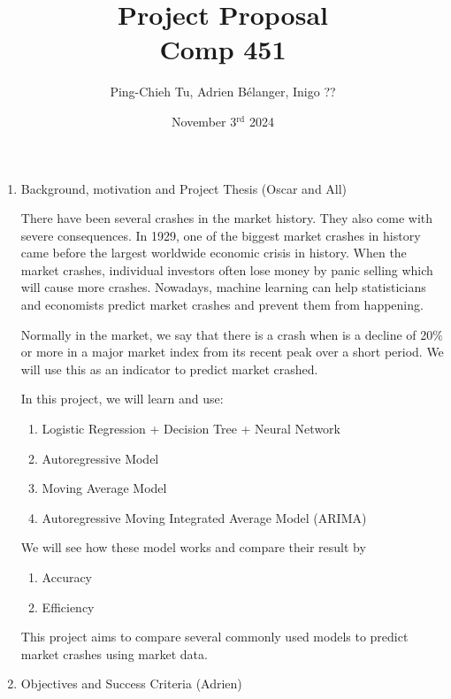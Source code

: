 \documentclass[10pt, letterpaper]{article}
\title{
  Project Proposal \\
  \Large Comp 451}
\author{Ping-Chieh Tu, Adrien Bélanger, Inigo ??}
\date{November 3$^{\text{rd}}$ 2024}
\begin{document}
\maketitle 

\begin{enumerate}
    \item Background, motivation and Project Thesis (Oscar and All)

    There have been several crashes in the market history. They also come with severe consequences. In 1929, one of the biggest market crashes in history came before the largest worldwide economic crisis in history. When the market crashes, individual investors often lose money by panic selling which will cause more crashes. Nowadays, machine learning can help statisticians and economists predict market crashes and prevent them from happening.

    Normally in the market, we say that there is a crash when is a decline of 20$\%$ or more in a major market index from its recent peak over a short period. We will use this as an indicator to predict market crashed.

    In this project, we will learn and use:
    \begin{enumerate}[label=\arabic*.]
      \item Logistic Regression + Decision Tree + Neural Network %
      \item Autoregressive Model
      \item Moving Average Model
      \item Autoregressive Moving Integrated Average Model (ARIMA)
    \end{enumerate}
    We will see how these model works and compare their result by
    \begin{enumerate}[label=\arabic*.]
      \item Accuracy
      \item Efficiency
    \end{enumerate}
    
    This project aims to compare several commonly used models to predict market crashes using market data.
    
    \item Objectives and Success Criteria (Adrien)
    

\end{enumerate}
\end{document}
